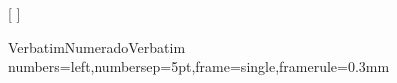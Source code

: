 \titleformat{\subsubsection}{
    \normalfont
    \bfseries
    \color{RoyalRed}
    }{\thesubsubsection}{0.7em}{\ul}

\titlespacing*{\chapter}{0pt}{0pt}{20pt}

\titlespacing*{\section}{0pt}{0pt}{10pt}


\titlespacing*{\subsubsection}{0pt}{0pt}{5pt}

\titleformat{\section}{
    \normalfont
    \Large
    \bfseries
  }{\thesection}{1em}{}[{
    \color{RoyalRed}
    \titlerule[0.8pt]}]

\setlength{\parindent}{2.5em}

\setlength{\parskip}{0.5em}





\DefineVerbatimEnvironment
    {VerbatimNumerado}{Verbatim}
    {numbers=left,numbersep=5pt,frame=single,framerule=0.3mm}


